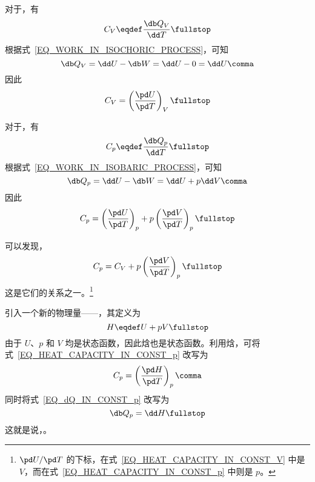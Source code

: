     对于，有
    \begin{equation}
      C_V \eqdef \frac{\db Q_V}{\dd T} \fullstop
    \end{equation}
    根据式~\eqref{EQ_WORK_IN_ISOCHORIC_PROCESS}，可知
    \begin{equation}
      \db Q_V = \dd U - \db W = \dd U - 0 = \dd U \comma
    \end{equation}
    因此
    \begin{equation} \label{EQ_HEAT_CAPACITY_IN_CONST_V}
      C_V = \left( \frac{\pd U}{\pd T} \right)_V \fullstop
    \end{equation}
    
    对于，有
    \begin{equation}
      C_p \eqdef \frac{\db Q_p}{\dd T} \fullstop
    \end{equation}
    根据式~\eqref{EQ_WORK_IN_ISOBARIC_PROCESS}，可知
    \begin{equation} \label{EQ_dQ_IN_CONST_p}
      \db Q_p = \dd U - \db W = \dd U + p \dd V \comma
    \end{equation}
    因此
    \begin{equation} \label{EQ_HEAT_CAPACITY_IN_CONST_p}
      C_p = \left( \frac{\pd U}{\pd T} \right)_p + p \left( \frac{\pd V}{\pd T} \right)_p \fullstop
    \end{equation}
    
    可以发现，
    \begin{equation}
      C_p = C_V + p \left( \frac{\pd V}{\pd T} \right)_p \fullstop
    \end{equation}
    这是它们的关系之一。\footnote{
      $\pd U / \pd T$ 的下标，在式~\eqref{EQ_HEAT_CAPACITY_IN_CONST_V} 中是 $V$，而在式~\eqref{EQ_HEAT_CAPACITY_IN_CONST_p} 中则是 $p$。%
    }%
    
    \blankline
    
    引入一个新的物理量——，其定义为
    \begin{equation}
      H \eqdef U + p V \fullstop
    \end{equation}
    由于 $U$、$p$ 和 $V$ 均是状态函数，因此焓也是状态函数。利用焓，可将式~\eqref{EQ_HEAT_CAPACITY_IN_CONST_p} 改写为
    \begin{equation} \label{EQ_HEAT_CAPACITY_IN_CONST_p_WITH_H}
      C_p = \left( \frac{\pd H}{\pd T} \right)_p \comma
    \end{equation}
    同时将式~\eqref{EQ_dQ_IN_CONST_p} 改写为
    \begin{equation}
      \db Q_p = \dd H \fullstop
    \end{equation}
    这就是说，。
    
